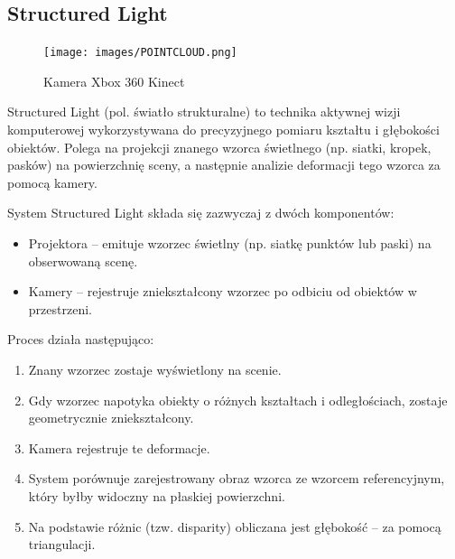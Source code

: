 \documentclass[magisterska]{pracadypl}
\begin{document}
\subsection{Structured Light}

\begin{figure}[H]  %
    \centering  %
    \texttt{[image: images/POINTCLOUD.png]}  %
    \captionsetup{font=footnotesize}
    \caption[Kamera Xbox 360 Kinect. https://cell-kom.com/inne/21454-kamera-internetowa-full-hd-b16-1080p-5900217390350.html]{Kamera Xbox 360 Kinect}
    \label{fig:kinect}  %
\end{figure}

Structured Light (pol. światło strukturalne) to technika aktywnej wizji komputerowej wykorzystywana do precyzyjnego pomiaru kształtu i głębokości obiektów. Polega na projekcji znanego wzorca świetlnego (np. siatki, kropek, pasków) na powierzchnię sceny, a następnie analizie deformacji tego wzorca za pomocą kamery.

\bigskip

System Structured Light składa się zazwyczaj z dwóch komponentów:

\begin{itemize}
  \item Projektora – emituje wzorzec świetlny (np. siatkę punktów lub paski) na obserwowaną scenę.

  \item Kamery – rejestruje zniekształcony wzorzec po odbiciu od obiektów w przestrzeni.
\end{itemize}

Proces działa następująco:

\begin{enumerate}
  \item Znany wzorzec zostaje wyświetlony na scenie.

  \item Gdy wzorzec napotyka obiekty o różnych kształtach i odległościach, zostaje geometrycznie zniekształcony.

  \item Kamera rejestruje te deformacje.

  \item System porównuje zarejestrowany obraz wzorca ze wzorcem referencyjnym, który byłby widoczny na płaskiej powierzchni.

  \item Na podstawie różnic (tzw. disparity) obliczana jest głębokość – za pomocą triangulacji.
\end{enumerate}
\end{document}
